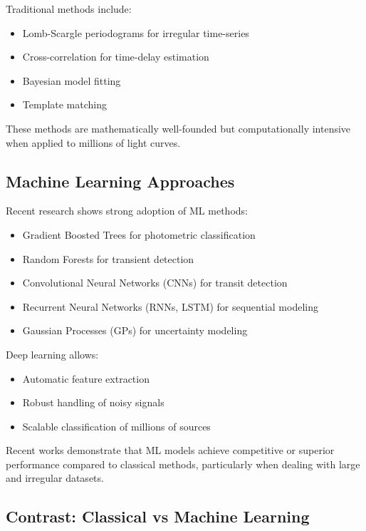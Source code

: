\documentclass[12pt]{article}
\begin{document}
Traditional methods include:

\begin{itemize}
    \item Lomb-Scargle periodograms for irregular time-series
    \item Cross-correlation for time-delay estimation
    \item Bayesian model fitting
    \item Template matching
\end{itemize}

These methods are mathematically well-founded but computationally intensive when applied to millions of light curves.

\subsection{Machine Learning Approaches}

Recent research shows strong adoption of ML methods:

\begin{itemize}
    \item Gradient Boosted Trees for photometric classification
    \item Random Forests for transient detection
    \item Convolutional Neural Networks (CNNs) for transit detection
    \item Recurrent Neural Networks (RNNs, LSTM) for sequential modeling
    \item Gaussian Processes (GPs) for uncertainty modeling
\end{itemize}

Deep learning allows:
\begin{itemize}
    \item Automatic feature extraction
    \item Robust handling of noisy signals
    \item Scalable classification of millions of sources
\end{itemize}

Recent works demonstrate that ML models achieve competitive or superior performance compared to classical methods, particularly when dealing with large and irregular datasets.

\subsection{Contrast: Classical vs Machine Learning}
\end{document}
